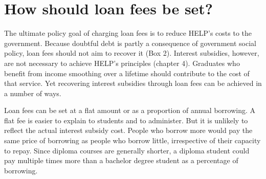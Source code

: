 \documentclass[embargoed]{grattan}
\begin{document}
\section{How should loan fees be set?}\label{how-should-loan-fees-be-set}

The ultimate policy goal of charging loan fees is to reduce HELP's costs to the government.
Because doubtful debt is partly a consequence of government social policy, loan fees should not aim to recover it (Box 2).
Interest subsidies, however, are not necessary to achieve HELP's principles (chapter 4).
Graduates who benefit from income smoothing over a lifetime should contribute to the cost of that service.
Yet recovering interest subsidies through loan fees can be achieved in a number of ways.

Loan fees can be set at a flat amount or as a proportion of annual borrowing.
A flat fee is easier to explain to students and to administer.
But it is unlikely to reflect the actual interest subsidy cost.
People who borrow more would pay the same price of borrowing as people who borrow little, irrespective of their capacity to repay.
Since diploma courses are generally shorter, a diploma student could pay multiple times more than a bachelor degree student as a percentage of borrowing.
\end{document}
